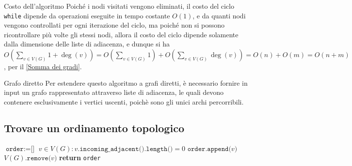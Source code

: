 \documentclass[a4paper, 12pt]{report}
\begin{document}
    \begin{framedobs}{Costo dell'algoritmo}
        \label{costo findReachableNodes2}
        Poiché i nodi visitati vengono eliminati, il costo del ciclo \texttt{while} dipende da operazioni eseguite in tempo costante $O(1)$, e da quanti nodi vengono controllati per ogni iterazione del ciclo, ma poiché non si possono ricontrollare più volte gli stessi nodi, allora il costo del ciclo dipende solamente dalla dimensione delle liste di adiacenza, e dunque si ha $\displaystyle O\left( \sum_{v \in V(G)}{1 + \deg(v)}\right)=O\left(\sum_{v \in V(G)}{1}\right) + O\left(\sum_{v \in V(G)}{\deg(v)}\right) = O(n) + O(m) = O(n+ m)$, per il \cref{Somma dei gradi}.
    \end{framedobs}

    \begin{framedobs}{Grafo diretto}
        Per estendere questo algoritmo a grafi diretti, è necessario fornire in input un grafo rappresentato attraverso liste di adiacenza, le quali devono contenere esclusivamente i vertici uscenti, poichè sono gli unici archi percorribili.
    \end{framedobs}

    \subsection{Trovare un ordinamento topologico}

    \begin{algorithm}[H]
        \caption{
            Dato un grafo diretto aciclico $G$, l'algoritmo restituisce un suo ordinamento topologico.\\
            \textbf{Input}: $G$ grafo diretto aciclico.\\
            \textbf{Output}: un ordinamento topologico di $G$.
        }

        \begin{algorithmic}[1]
                \State $\texttt{order} := \texttt{[}\texttt{]}$
                    \State $v \in V(G) : v.\texttt{incoming\_adjacent().length()} = 0$
                    \State $\texttt{order.append(}v\texttt{)}$
                    \State $V(G)\texttt{.remove(}v\texttt{)}$
                \EndWhile
                \State \textbf{return} \texttt{order}
            \EndFunction
        \end{algorithmic}
    \end{algorithm}
\end{document}

